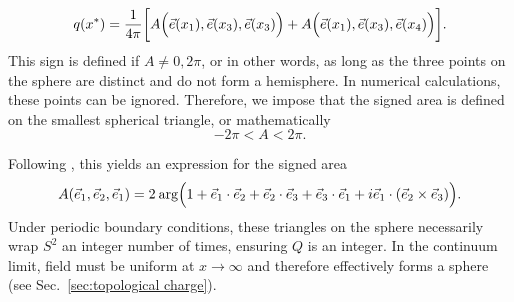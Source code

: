 \begin{equation}
    q(x^*) = \frac{1}{4\pi} \bigg[A\Big(\vec e(x_1), \vec e(x_3), \vec e(x_3)\Big) + A\Big(\vec e(x_1), \vec e(x_3), \vec e(x_4)\Big) \bigg].
\end{equation}
This sign is defined if $A\neq 0, 2\pi$, or in other words, as long as the three points on the sphere are distinct and do not form a hemisphere. In numerical calculations, these points can be ignored. Therefore, we impose that the signed area is defined on the smallest spherical triangle, or mathematically
\begin{equation}
    -2\pi < A < 2\pi.
\end{equation}


Following \cite{berg1981}, this yields an expression for the signed area
\begin{equation}
    A(\vec e_1, \vec e_2, \vec e_1) = 2 \:\mathrm{arg}\Big(1+\vec e_1\cdot\vec e_2 + \vec e_2\cdot\vec e_3 + \vec e_3\cdot\vec e_1 + i\vec e_1 \cdot (\vec e_2\times\vec e_3)\Big).
\end{equation}
Under periodic boundary conditions, these triangles on the sphere necessarily wrap $S^2$ an integer number of times, ensuring $Q$ is an integer. In the continuum limit, field must be uniform at $x\rightarrow\infty$ and therefore effectively forms a sphere (see Sec.~\ref{sec:topological charge}).
